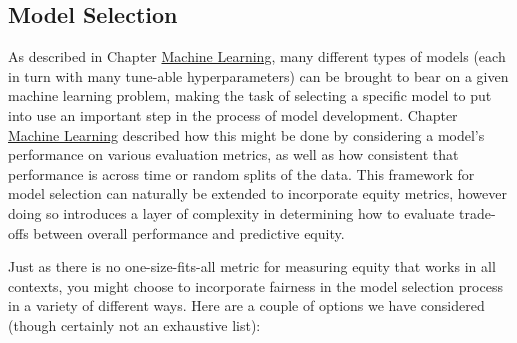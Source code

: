 \documentclass[]{krantz}
\begin{document}
\subsection{Model Selection}\label{model-selection}

As described in Chapter \protect\hyperlink{chap:ml}{Machine Learning},
many different types of models (each in turn with many tune-able
hyperparameters) can be brought to bear on a given machine learning
problem, making the task of selecting a specific model to put into use
an important step in the process of model development. Chapter
\protect\hyperlink{chap:ml}{Machine Learning} described how this might
be done by considering a model's performance on various evaluation
metrics, as well as how consistent that performance is across time or
random splits of the data. This framework for model selection can
naturally be extended to incorporate equity metrics, however doing so
introduces a layer of complexity in determining how to evaluate
trade-offs between overall performance and predictive equity.

Just as there is no one-size-fits-all metric for measuring equity that
works in all contexts, you might choose to incorporate fairness in the
model selection process in a variety of different ways. Here are a
couple of options we have considered (though certainly not an exhaustive
list):
\end{document}

